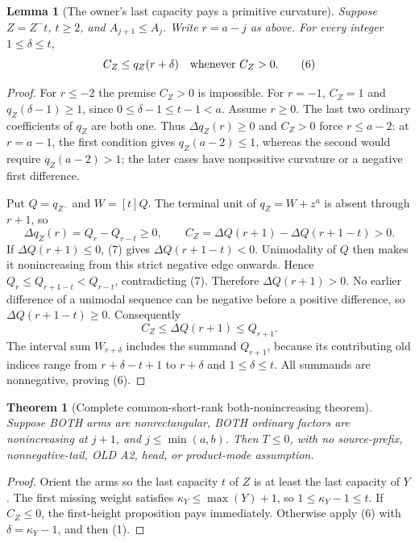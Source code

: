 \documentclass[11pt]{article}
\newtheorem{lemma}[proposition]{Lemma}
\newtheorem{theorem}[proposition]{Theorem}
\begin{document}
\begin{lemma}[The owner's last capacity pays a primitive curvature]
Suppose $Z=Z^-t$, $t\ge2$, and $A_{j+1}\le A_j$.
Write $r=a-j$ as above. For every integer $1\le\delta\le t$,
\[
                    C_Z\le q_Z(r+\delta)
                 \quad\hbox{whenever }C_Z>0.        \tag{6}
\]
\end{lemma}
\begin{proof}
For $r\le-2$ the premise $C_Z>0$ is impossible. For $r=-1$,
$C_Z=1$ and $q_Z(\delta-1)\ge1$, since
$0\le\delta-1\le t-1<a$. Assume $r\ge0$.
The last two ordinary coefficients of $q_Z$ are both one.
Thus $\Delta q_Z(r)\ge0$ and $C_Z>0$ force $r\le a-2$:
at $r=a-1$, the first condition gives $q_Z(a-2)\le1$, whereas
the second would require $q_Z(a-2)>1$; the later cases have
nonpositive curvature or a negative first difference.

Put $Q=q_{Z^-}$ and $W=[t]Q$. The terminal unit of
$q_Z=W+z^a$ is absent through $r+1$, so
\[
 \Delta q_Z(r)=Q_r-Q_{r-t}\ge0,\qquad
 C_Z=\Delta Q(r+1)-\Delta Q(r+1-t)>0.                \tag{7}
\]
If $\Delta Q(r+1)\le0$, (7) gives
$\Delta Q(r+1-t)<0$. Unimodality of $Q$ then makes it
nonincreasing from this strict negative edge onwards. Hence
$Q_r\le Q_{r+1-t}<Q_{r-t}$, contradicting (7).
Therefore $\Delta Q(r+1)>0$. No earlier difference of a
unimodal sequence can be negative before a positive difference,
so $\Delta Q(r+1-t)\ge0$. Consequently
\[
 C_Z\le\Delta Q(r+1)\le Q_{r+1}.
\]
The interval sum $W_{r+\delta}$ includes the summand $Q_{r+1}$,
because its contributing old indices range from
$r+\delta-t+1$ to $r+\delta$ and $1\le\delta\le t$.
All summands are nonnegative, proving (6).
\end{proof}

\begin{theorem}[Complete common-short-rank both-nonincreasing theorem]
Suppose BOTH arms are nonrectangular, BOTH ordinary factors
are nonincreasing at $j+1$, and
$j\le\min(a,b)$. Then $T\le0$, with no source-prefix,
nonnegative-tail, OLD A2, head, or product-mode assumption.
\end{theorem}
\begin{proof}
Orient the arms so the last capacity $t$ of $Z$ is at least
the last capacity of $Y$. The first missing weight satisfies
$\kappa_Y\le\max(Y)+1$, so $1\le\kappa_Y-1\le t$.
If $C_Z\le0$, the first-height proposition pays immediately.
Otherwise apply (6) with $\delta=\kappa_Y-1$, and then (1).
\end{proof}
\end{document}
